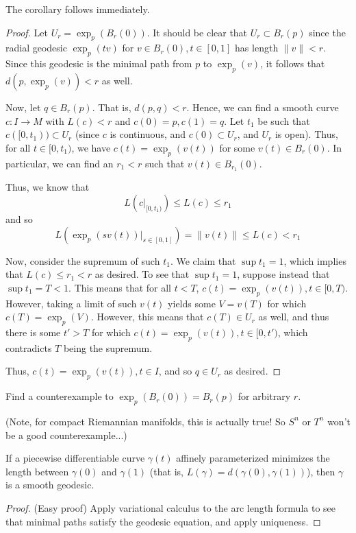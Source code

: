 \documentclass[../main.tex]{subfiles}
\begin{document}
The corollary follows immediately.

\begin{proof}
    Let $U_r = \exp_p(B_r(0))$. It should be clear that $U_r\subset B_r(p)$
    since the radial geodesic $\exp_p(tv)$ for $v\in B_r(0), t\in[0,1]$ has
    length $\|v\| <r$. Since this geodesic is the minimal path from $p$ to
    $\exp_p(v)$, it follows that $d(p,\exp_p(v))<r$ as well.

    Now, let $q\in B_r(p)$. That is, $d(p,q)<r$. Hence, we can find a smooth
    curve $c:I\to M$ with $L(c)<r$ and $c(0)=p,c(1)=q$.
    Let $t_1$ be such that $c([0,t_1))\subset U_r$ (since $c$ is continuous, and
    $c(0)\subset U_r$, and $U_r$ is open).
    Thus, for all $t\in[0,t_1)$, we have $c(t) = \exp_p(v(t))$ for some $v(t)\in
    B_r(0)$. In particular, we can find an $r_1<r$ such that $v(t)\in
    B_{r_1}(0)$. 

    Thus, we know that
    \[
        L(c|_{[0,t_1)})\leq L(c)\leq r_1
    \]
    and so
    \[
        L(\exp_p(sv(t))|_{s\in[0,1]})=\|v(t)\|\leq L(c) <r_1
    \]

    Now, consider the supremum of such $t_1$. We claim that $\sup t_1 = 1$,
    which implies that $L(c)\leq r_1<r$ as desired. To see that $\sup t_1 = 1$,
    suppose instead that $\sup t_1 = T < 1$. This means that for all $t<T$,
    $c(t) = \exp_p(v(t)), t\in[0,T)$. However, taking a limit of such $v(t)$
    yields some $V = v(T)$ for which $c(T) = \exp_p(V)$. However, this means
    that $c(T)\in U_r$ as well, and thus there is some $t' > T$ for which $c(t)
    = \exp_p(v(t)),t\in[0,t')$, which contradicts $T$ being the supremum.

    Thus, $c(t) = \exp_p(v(t)),t\in I$, and so $q\in U_r$ as desired.
\end{proof}

\begin{hw}
    Find a counterexample to $\exp_p(B_r(0)) = B_r(p)$ for arbitrary $r$.
\end{hw}
(Note, for compact Riemannian manifolds, this is actually true! So $S^n$ or
$T^n$ won't be a good counterexample...)


\begin{cor}
    If a piecewise differentiable curve $\gamma(t)$ affinely parameterized
    minimizes the length between $\gamma(0)$ and $\gamma(1)$ (that is,
    $L(\gamma) = d(\gamma(0),\gamma(1))$), then $\gamma$ is a smooth geodesic.
\end{cor}

\begin{proof}
    (Easy proof) Apply variational calculus to the arc length formula to see
    that minimal paths satisfy the geodesic equation, and apply uniqueness.
\end{proof}
\end{document}

